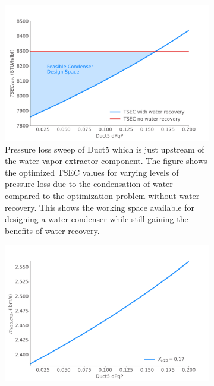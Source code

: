 \documentclass[conf]{new-aiaa}
\begin{document}
\begin{figure}[hbt!]
    \centering
    \begin{subfigure}[t]{0.49\textwidth}
        \includegraphics[width=\textwidth]{N3_dpqp.pdf}
        \caption{Pressure loss sweep of Duct5 which is just upstream of the water vapor extractor component.
            The figure shows the optimized TSEC values for varying levels of pressure loss due to the condensation of water compared to the optimization problem without water recovery.
            This shows the working space available for designing a water condenser while still gaining the benefits of water recovery.}
        \label{fig:dpqp_sweep}
    \end{subfigure}
    \hspace{2pt}
    \begin{subfigure}[t]{0.49\textwidth}
        \includegraphics[width=\textwidth]{N3_wdot.pdf}

\end{subfigure}
\end{figure}
\end{document}
